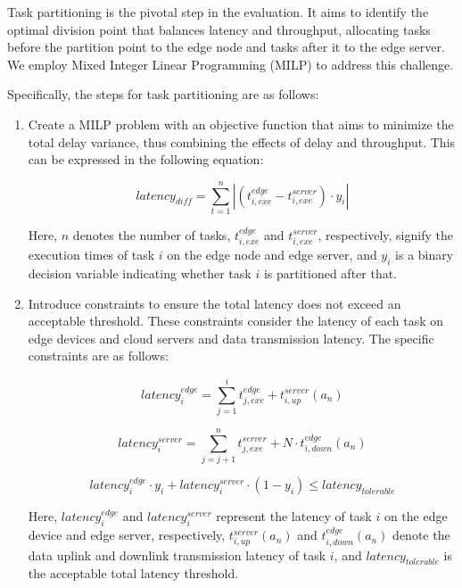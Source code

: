 \documentclass[preprint,12pt]{elsarticle}
\begin{document}
Task partitioning is the pivotal step in the evaluation. It aims to identify the optimal division point that balances latency and throughput, allocating tasks before the partition point to the edge node and tasks after it to the edge server\cite{wang2023task}. We employ Mixed Integer Linear Programming (MILP) to address this challenge.

Specifically, the steps for task partitioning are as follows:

\begin{enumerate}
    \item Create a MILP problem with an objective function that aims to minimize the total delay variance, thus combining the effects of delay and throughput. This can be expressed in the following equation:

    \begin{equation}
    \label{eq. 12}
        latency_{diff}=\sum^n_{t=1}|(t_{i,exe}^{edge}-t_{i,exe}^{server})\cdot y_i|
    \end{equation}

    Here, \(n\) denotes the number of tasks, \(t_{i,exe}^{edge}\) and \(t_{i,exe}^{server}\), respectively, signify the execution times of task \(i\) on the edge node and edge server, and \(y_i\) is a binary decision variable indicating whether task \(i\) is partitioned after that.

    \item Introduce constraints to ensure the total latency does not exceed an acceptable threshold. These constraints consider the latency of each task on edge devices and cloud servers and data transmission latency. The specific constraints are as follows:

    \begin{equation}
    \label{eq. 13}
    latency_i^{edge}=\sum^i_{j=1}t_{j,exe}^{edge}+t_{i,up}^{server}(a_n)
    \end{equation}

    \begin{equation}
    \label{eq. 14}
        latency_i^{server} = \sum^n_{j=j+1}t_{j,exe}^{server}+N\cdot t_{i,down}^{edge}(a_n)
    \end{equation}
    
    \begin{equation}
    \label{eq. 15}
        latency_i^{edge}\cdot y_i+latency_i^{server}\cdot(1-y_i)\leq latency_{tolerable}
     \end{equation}

    Here, \(latency_i^{edge}\) and \(latency_i^{server}\) represent the latency of task \(i\) on the edge device and edge server, respectively, \(t_{i,up}^{server}(a_n)\) and \(t_{i,down}^{edge}(a_n)\) denote the data uplink and downlink transmission latency of task \(i\), and \(latency_{tolerable}\) is the acceptable total latency threshold.
    
\end{enumerate}
\end{document}
